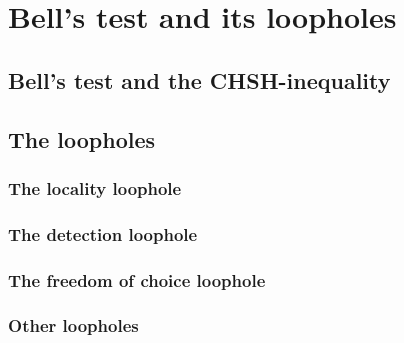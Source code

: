 \color{tudelft-cyan}
\chapter{Bell's test and its loopholes}
\color{black}


\label{intro}

\color{tudelft-cyan}
\section{Bell's test and the CHSH-inequality}
\color{black}


\color{tudelft-cyan}
\section{The loopholes}
\color{black}


\color{tudelft-cyan}
\subsection{The locality loophole}
\color{black}


\color{tudelft-cyan}
\subsection{The detection loophole}
\color{black}

\color{tudelft-cyan}
\subsection{The freedom of choice loophole}
\color{black}

\color{tudelft-cyan}
\subsection{Other loopholes}
\color{black}